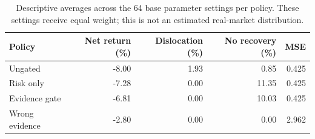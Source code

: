 \begin{table}[htbp]\centering\small
\begin{tabular}{lrrrr}\toprule
Policy & Net return (\%) & Dislocation (\%) & No recovery (\%) & MSE\\\midrule
Ungated & -8.00 & 1.93 & 0.85 & 0.425\\
Risk only & -7.28 & 0.00 & 11.35 & 0.425\\
Evidence gate & -6.81 & 0.00 & 10.03 & 0.425\\
Wrong evidence & -2.80 & 0.00 & 0.00 & 2.962\\
\bottomrule\end{tabular}
\caption{Descriptive averages across the 64 base parameter settings per policy. These settings receive equal weight; this is not an estimated real-market distribution.}
\end{table}